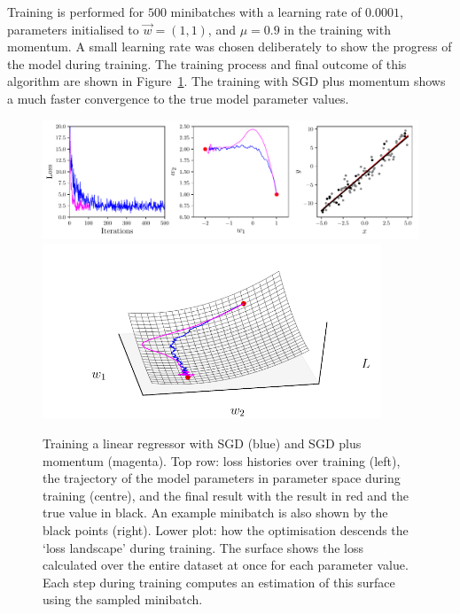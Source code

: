 Training is performed for $500$ minibatches with a learning rate of $0.0001$, parameters initialised to $\vec{w}=(1,1)$, and $\mu=0.9$ in the training with momentum. 
A small learning rate was chosen deliberately to show the progress of the model during training. 
The training process and final outcome of this algorithm are shown in Figure~\ref{fig:machine_learning:lin_example}.
The training with SGD plus momentum shows a much faster convergence to the true model parameter values.
\begin{figure}[h!]
    \begin{center}
        \includegraphics[width=1.0\textwidth]{figures/machine_learning/ML_figure_1.pdf}
        \includegraphics[width=0.9\textwidth]{figures/machine_learning/ML_figure_1_3Dloss.pdf}
    \end{center}
    \caption{Training a linear regressor with SGD (blue) and SGD plus momentum (magenta). Top row: loss histories over training (left), the trajectory of the model parameters in parameter space during training (centre), and the final result with the result in red and the true value in black. An example minibatch is also shown by the black points (right).
            Lower plot: how the optimisation descends the `loss landscape' during training. The surface shows the loss calculated over the entire dataset at once for each parameter value. Each step during training computes an estimation of this surface using the sampled minibatch.}
        \label{fig:machine_learning:lin_example}
\end{figure}




